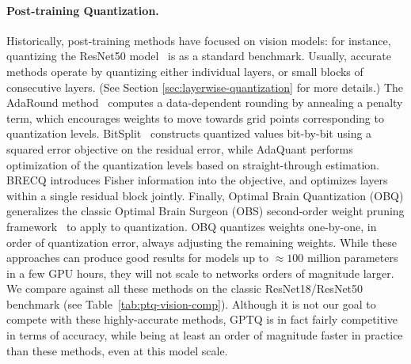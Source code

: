 \paragraph{Post-training Quantization.} Historically, post-training methods have focused on vision models: for instance, quantizing the ResNet50 model~\cite{he2016deep} is as a standard benchmark. Usually, accurate methods operate by quantizing either individual layers, or small blocks of consecutive layers. (See Section \ref{sec:layerwise-quantization} for more details.) The AdaRound method~\cite{nagel2020up} computes a data-dependent rounding by annealing a penalty term, which encourages weights to move towards grid points corresponding to quantization levels. BitSplit~\cite{wang2020towards} constructs quantized values bit-by-bit using a squared error objective on the residual error, while AdaQuant \cite{hubara2021accurate} performs  optimization of the quantization levels based on straight-through estimation. BRECQ \cite{li2021brecq} introduces Fisher information into the objective, and optimizes layers within a single residual block jointly. Finally, Optimal Brain Quantization (OBQ) \cite{frantar2022obc} generalizes the classic Optimal Brain Surgeon (OBS) second-order weight pruning framework~\cite{hassibi1993optimal, singh2020woodfisher, frantar2021m} to apply to quantization. OBQ quantizes weights one-by-one, in order of quantization error, always adjusting the remaining weights. While these approaches can produce good results for models up to $\approx100$ million parameters in a few GPU hours, they will not scale to networks orders of magnitude larger. We compare against all these methods on the classic ResNet18/ResNet50 benchmark (see Table~\ref{tab:ptq-vision-comp}). Although it is not our goal to compete with these highly-accurate methods, GPTQ is in fact fairly competitive in terms of accuracy, while being at least an order of magnitude faster in practice than these methods, even at this model scale. 

